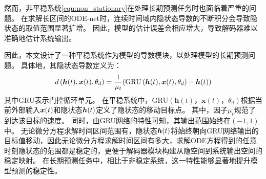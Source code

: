 然而，非平稳系统\eqref{equ:non_stationary}在处理长期预测任务时也面临着严重的问题。
在求解长区间的ODE-net时，连续时间域内隐状态导数的不断积分会导致隐状态的取值范围显著扩增。
因此，模型的估计误差会相应增大，导致解码器难以准确地估计系统输出。

因此，本文设计了一种平稳系统作为模型的导数模块，以处理模型的长期预测问题。
具体地，其隐状态导数定义为：
\begin{equation}
\label{equ:stationary}
d\left(\boldsymbol{h}(t), \boldsymbol{x}(t), \theta_{d}\right)=\frac{1}{\mu _t}(\text{GRU}\left(\boldsymbol{h}(t), \boldsymbol{x}(t), \theta_{d}\right)-\boldsymbol h(t))
\end{equation}
其中$\text{GRU}$表示门控循环单元。
在平稳系统中，$\text{GRU}\left(\boldsymbol{h}(t)， \boldsymbol{x}(t)， \theta_{d}\right)$根据当前外部输入$\boldsymbol x(t)$和隐状态$\boldsymbol h(t)$定义了隐状态的移动目标点。
其中，因子$\mu_t$规范了到达该目标的速度。
同时，由GRU网络的特性可知，其输出范围始终在$(-1,1)$中。
无论微分方程求解时间区间范围有，隐状态$\boldsymbol h (t)$将始终朝向GRU网络输出的目标值移动，因此无论微分方程求解时间区间有多大，求解ODE方程得到的任意时刻隐状态的范围都是稳定的，更便于解码器模块构建从隐空间到系统输出空间的稳定映射。
在长期预测任务中，相比于非稳定系统，这一特性能够显著地提升模型预测的稳定性。

